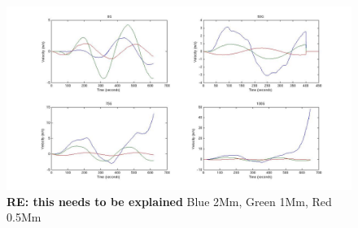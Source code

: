 \documentclass{aastex62}
\begin{document}





\begin{figure}[h]\label{dt_vvert_5b2_2_2Mm_1Mm_0p5MM_0G_25G_50G_100G_line}
\includegraphics[scale=0.45]{imrescale/dt_vvert_5b2_2_2Mm_1Mm_0p5MM_0G_25G_50G_100G_line.jpg}
\caption{{\bf RE: this needs to be explained} Blue 2Mm, Green 1Mm, Red 0.5Mm}
\end{figure}



\end{document}

